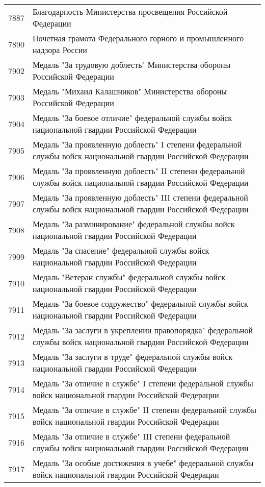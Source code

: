 \documentclass[10pt, a4paper, titlepage]{article}
\begin{document}
\begin{center}
\begin{longtable}{rp{}}
        7887 & Благодарность Министерства просвещения Российской Федерации \\
        7890 & Почетная грамота Федерального горного и промышленного надзора России \\
        7902 & Медаль "За трудовую доблесть" Министерства обороны Российской Федерации \\
        7903 & Медаль "Михаил Калашников" Министерства обороны Российской Федерации \\
        7904 & Медаль "За боевое отличие" федеральной службы войск национальной гвардии Российской Федерации \\
        7905 & Медаль "За проявленную доблесть" I степени федеральной службы войск национальной гвардии Российской Федерации \\
        7906 & Медаль "За проявленную доблесть" II степени федеральной службы войск национальной гвардии Российской Федерации \\
        7907 & Медаль "За проявленную доблесть" III степени федеральной службы войск национальной гвардии Российской Федерации \\
        7908 & Медаль "За разминирование" федеральной службы войск национальной гвардии Российской Федерации \\
        7909 & Медаль "За спасение" федеральной службы войск национальной гвардии Российской Федерации \\
        7910 & Медаль "Ветеран службы" федеральной службы войск национальной гвардии Российской Федерации \\
        7911 & Медаль "За боевое содружество" федеральной службы войск национальной гвардии Российской Федерации \\
        7912 & Медаль "За заслуги в укреплении правопорядка" федеральной службы войск национальной гвардии Российской Федерации \\
        7913 & Медаль "За заслуги в труде" федеральной службы войск национальной гвардии Российской Федерации \\
        7914 & Медаль "За отличие в службе" I степени федеральной службы войск национальной гвардии Российской Федерации \\
        7915 & Медаль "За отличие в службе" II степени федеральной службы войск национальной гвардии Российской Федерации \\
        7916 & Медаль "За отличие в службе" III степени федеральной службы войск национальной гвардии Российской Федерации \\
        7917 & Медаль "За особые достижения в учебе" федеральной службы войск национальной гвардии Российской Федерации \\

\end{longtable}
\end{center}
\end{document}
